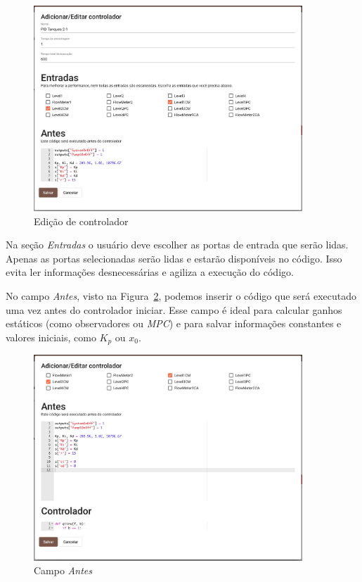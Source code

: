 \begin{figure}[ht!]
    \centering
    \includegraphics[width=0.9\textwidth]{imgs/control2}
    \caption[Edição de controlador]{Edição de controlador}%
    \label{fig:control2}
\end{figure}

Na seção \textit{Entradas} o usuário deve escolher as portas de entrada que
serão lidas. Apenas as portas selecionadas serão lidas e estarão disponíveis no
código. Isso evita ler informações desnecessárias e agiliza a execução do
código.

No campo \textit{Antes}, visto na Figura~\ref{fig:control3}, podemos inserir o
código que será executado uma vez antes do controlador iniciar. Esse campo é
ideal para calcular ganhos estáticos (como observadores ou \textit{MPC}) e para
salvar informações constantes e valores iniciais, como \(K_p\) ou \(x_0\).

\begin{figure}[ht!]
    \centering
    \includegraphics[width=0.9\textwidth]{imgs/control3}
    \caption[Campo \textit{Antes}]{Campo \textit{Antes}}%
    \label{fig:control3}
\end{figure}

